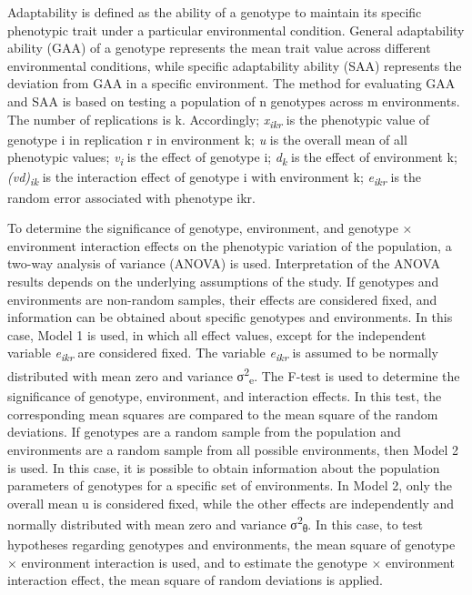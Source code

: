 \documentclass[
]{article}
\begin{document}
Adaptability is defined as the ability of a genotype to maintain its
specific phenotypic trait under a particular environmental condition.
General adaptability ability (GAA) of a genotype represents the mean
trait value across different environmental conditions, while specific
adaptability ability (SAA) represents the deviation from GAA in a
specific environment. The method for evaluating GAA and SAA is based on
testing a population of n genotypes across m environments. The number of
replications is k. Accordingly; \emph{x\textsubscript{ikr}} is the
phenotypic value of genotype i in replication r in environment k;
\emph{u} is the overall mean of all phenotypic values;
\emph{v\textsubscript{i}} is the effect of genotype i;
\emph{d\textsubscript{k}} is the effect of environment k;
\emph{(vd)\textsubscript{ik}} is the interaction effect of genotype i
with environment k; \emph{e\textsubscript{ikr}} is the random error
associated with phenotype ikr.

To determine the significance of genotype, environment, and genotype ×
environment interaction effects on the phenotypic variation of the
population, a two-way analysis of variance (ANOVA) is used.
Interpretation of the ANOVA results depends on the underlying
assumptions of the study. If genotypes and environments are non-random
samples, their effects are considered fixed, and information can be
obtained about specific genotypes and environments. In this case, Model
1 is used, in which all effect values, except for the independent
variable \emph{e\textsubscript{ikr}} are considered fixed. The variable
\emph{e\textsubscript{ikr}} is assumed to be normally distributed with
mean zero and variance σ\textsuperscript{2}\textsubscript{e}. The F-test
is used to determine the significance of genotype, environment, and
interaction effects. In this test, the corresponding mean squares are
compared to the mean square of the random deviations. If genotypes are a
random sample from the population and environments are a random sample
from all possible environments, then Model 2 is used. In this case, it
is possible to obtain information about the population parameters of
genotypes for a specific set of environments. In Model 2, only the
overall mean u is considered fixed, while the other effects are
independently and normally distributed with mean zero and variance
σ\textsuperscript{2}\textsubscript{θ}. In this case, to test hypotheses
regarding genotypes and environments, the mean square of genotype ×
environment interaction is used, and to estimate the genotype ×
environment interaction effect, the mean square of random deviations is
applied.
\end{document}
